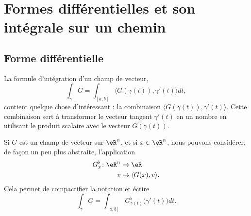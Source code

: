 \section{Formes différentielles et son intégrale sur un chemin}

\subsection{Forme différentielle}

La formule d'intégration d'un champ de vecteur,
\begin{equation}
	\int_{\gamma}G=\int_{[a,b]}\langle G (\gamma(t)), \gamma'(t)\rangle dt,
\end{equation}
contient quelque chose d'intéressant : la combinaison $\langle G( \gamma(t) ), \gamma'(t)\rangle$. Cette combinaison sert à transformer le vecteur tangent $\gamma'(t)$ en un nombre en utilisant le produit scalaire avec le vecteur $G( \gamma(t) )$.

Si $G$ est un champ de vecteur sur $\eR^n$, et si $x\in\eR^n$, nous pouvons considérer, de façon un peu plus abstraite, l'application
\begin{equation}		\label{EqDefBemol}
	\begin{aligned}[]
		G^{\flat}_x\colon \eR^n&\to \eR \\
			v&\mapsto \langle G(x), v\rangle . 
	\end{aligned}
\end{equation}
Cela permet de compactifier la notation et écrire
\begin{equation}
	\int_{\gamma}G=\int_{[a,b]} G^{\flat}_{\gamma(t)}\big( \gamma'(t)\big) dt.
\end{equation}

